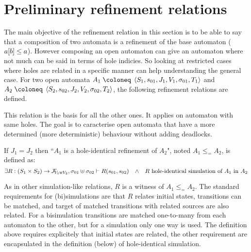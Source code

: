 \documentclass{article}
\begin{document}


\section{Preliminary refinement relations}
The main objective of the refinement relation in this section is to be able to say that a composition of two automata is a refinement of the base automaton (\(a{\left[b\right]} \leq a\)).
However composing an open automaton can give an automaton where not much can be said in terms of hole indicies.
So looking at restricted cases where holes are related in a specific manner can help understanding the general case.
For two open automata \(A_1 \defobject \OA{S_1}{s_{01}}{J_1}{V_1}{\sigma_{01}}{T_1}\) and \(A_2 \defobject \OA{S_2}{s_{02}}{J_2}{V_2}{\sigma_{02}}{T_2}\), the following refinement relations are defined.

This relation is the basis for all the other ones.
It applies on automaton with same holes.
The goal is to caracterise open automata that have a more determined (more deterministic) behaviour without adding deadlocks.
\begin{defi}
If \(J_1 = J_2\) then ``\(A_1\) is a hole-identical refinement of \(A_2\)", noted \(A_1 \leq_= A_2\), is defined as:
\[ \exists R: \mpar{S_1 \times S_2} \to \rformulae[V_1 \uplus V_2], \sigma_{01} \uplus \sigma_{02} \vdash R\mpar{s_{01}, s_{02}} \qwedge R \text{ hole-identical simulation of } A_1 \text{ in } A_2 \]
\end{defi}
As in other simulation-like relations, \(R\) is a witness of \(A_1 \leq_= A_2\).
The standard requirements for (bi)simulations are that \(R\) relates initial states, transitions can be matched, and target of matched transitions with related sources are also related.
For a bisimulation transitions are matched one-to-many from each automaton to the other, but for a simulation only one way is used.
The definition above requires explicitely that initial states are related, the other requirement are encapsulated in the definition (below) of hole-identical simulation.
\end{document}
